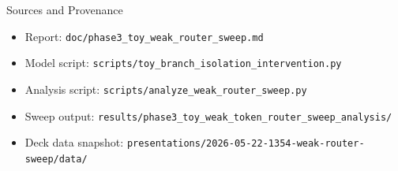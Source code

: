 \documentclass[aspectratio=169]{beamer}
\begin{document}
\begin{frame}{Sources and Provenance}
  \scriptsize
  \begin{itemize}
    \item Report: \texttt{doc/phase3\_toy\_weak\_router\_sweep.md}
    \item Model script: \texttt{scripts/toy\_branch\_isolation\_intervention.py}
    \item Analysis script: \texttt{scripts/analyze\_weak\_router\_sweep.py}
    \item Sweep output: \texttt{results/phase3\_toy\_weak\_token\_router\_sweep\_analysis/}
    \item Deck data snapshot: \texttt{presentations/2026-05-22-1354-weak-router-sweep/data/}
  \end{itemize}
\end{frame}
\end{document}
